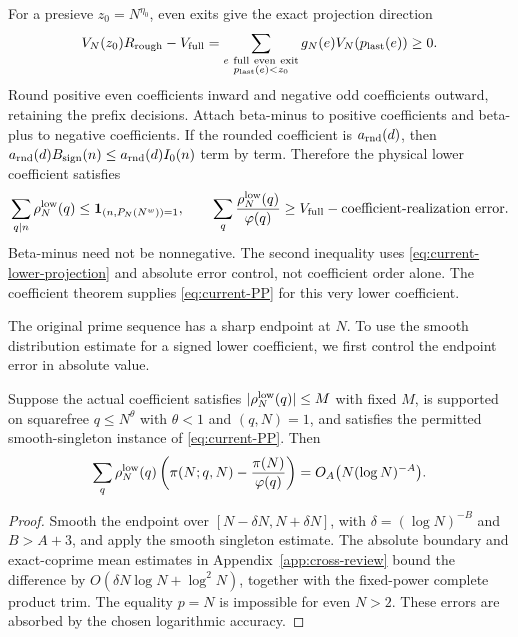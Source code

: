 For a presieve $z_0=N^{\eta_0}$, even exits give the exact projection
direction
\begin{equation}
 V_N(z_0)R_{\rm rough}-V_{\rm full}
  =\sum_{\substack{e\ {\rm full\ even\ exit}\\p_{\rm last}(e)<z_0}}
                              g_N(e)V_N(p_{\rm last}(e))\ge0.
 \label{eq:current-lower-projection}
\end{equation}
Round positive even coefficients inward and negative odd coefficients
outward, retaining the prefix decisions.  Attach beta-minus to positive
coefficients and beta-plus to negative coefficients.  If the rounded
coefficient is $a_{\rm rnd}(d)$, then
$a_{\rm rnd}(d)B_{\rm sign}(n)\le a_{\rm rnd}(d)I_0(n)$ term by term.  Therefore the
physical lower coefficient satisfies
\[
 \sum_{q\mid n}\rho_N^{\rm low}(q)\le
           {\mathbf 1}_{(n,P_N(N^w))=1},\qquad
 \sum_q\frac{\rho_N^{\rm low}(q)}{\varphi(q)}
              \ge V_{\rm full}-\text{coefficient-realization error}.
\]
Beta-minus need not be nonnegative.  The second inequality uses
\eqref{eq:current-lower-projection} and absolute error control, not
coefficient order alone.  The coefficient theorem supplies
\eqref{eq:current-PP} for this very lower coefficient.

The original prime sequence has a sharp endpoint at $N$. To use the
smooth distribution estimate for a signed lower coefficient, we first
control the endpoint error in absolute value.

\begin{lemma}
\label{lem:current-sharp-prime}
Suppose the actual coefficient satisfies $|\rho_N^{\rm low}(q)|\le M$ with
fixed $M$, is supported on squarefree $q\le N^\theta$ with
$\theta<1$ and $(q,N)=1$, and satisfies the permitted
smooth-singleton instance of \eqref{eq:current-PP}.  Then
\begin{equation}
 \sum_q\rho_N^{\rm low}(q)
    \left(\pi(N;q,N)-\frac{\pi(N)}{\varphi(q)}\right)
      =O_A\bigl(N(\log N)^{-A}\bigr).
 \label{eq:current-sharp-pi}
\end{equation}
\end{lemma}

\begin{proof}
Smooth the endpoint over $[N-\delta N,N+\delta N]$, with
$\delta=(\log N)^{-B}$ and $B>A+3$, and apply the smooth singleton
estimate. The absolute boundary and exact-coprime mean estimates in
Appendix~\ref{app:cross-review} bound the difference by
$O(\delta N\log N+\log^2N)$, together with the fixed-power complete
product trim. The equality $p=N$ is impossible for even $N>2$.
These errors are absorbed by the chosen logarithmic accuracy.
\end{proof}

